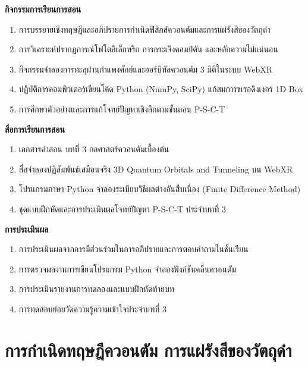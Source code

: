 \begin{lessonplanbox}
\vspace{0.4em}
\noindent\textbf{กิจกรรมการเรียนการสอน}
\begin{enumerate}
    \item การบรรยายเชิงทฤษฎีและอภิปรายการกำเนิดฟิสิกส์ควอนตัมและการแผ่รังสีของวัตถุดำ
    \item การวิเคราะห์ปรากฏการณ์โฟโตอิเล็กทริก การกระเจิงคอมป์ตัน และหลักความไม่แน่นอน
    \item กิจกรรมจำลองการทะลุผ่านกำแพงศักย์และออร์บิทัลควอนตัม 3 มิติในระบบ WebXR
    \item ปฏิบัติการคอมพิวเตอร์เขียนโค้ด Python (NumPy, SciPy) แก้สมการชเรอดิงเงอร์ 1D Box
    \item การศึกษาตัวอย่างและการแก้โจทย์ปัญหาเชิงลึกตามขั้นตอน P-S-C-T
\end{enumerate}

\vspace{0.4em}
\noindent\textbf{สื่อการเรียนการสอน}
\begin{enumerate}
    \item เอกสารคำสอน บทที่ 3 กลศาสตร์ควอนตัมเบื้องต้น
    \item สื่อจำลองปฏิสัมพันธ์เสมือนจริง 3D Quantum Orbitals and Tunneling บน WebXR
    \item โปรแกรมภาษา Python จำลองระเบียบวิธีผลต่างอันสืบเนื่อง (Finite Difference Method)
    \item ชุดแบบฝึกหัดและการประเมินผลโจทย์ปัญหา P-S-C-T ประจำบทที่ 3
\end{enumerate}

\vspace{0.4em}
\noindent\textbf{การประเมินผล}
\begin{enumerate}
    \item การประเมินผลจากการมีส่วนร่วมในการอภิปรายและการตอบคำถามในชั้นเรียน
    \item การตรวจผลงานการเขียนโปรแกรม Python จำลองฟังก์ชันคลื่นควอนตัม
    \item การประเมินรายงานการทดลองและแบบฝึกหัดท้ายบท
    \item การทดสอบย่อยวัดความรู้ความเข้าใจประจำบทที่ 3
\end{enumerate}
\end{lessonplanbox}

\newpage

\section{การกำเนิดทฤษฎีควอนตัม การแผ่รังสีของวัตถุดำ}

